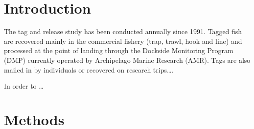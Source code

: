 \documentclass[12pt]{article}\usepackage[]{graphicx}\usepackage[]{color}
\begin{document}

\frontmatter


\renewcommand{\headrulewidth}{0.5pt}  %
\renewcommand{\footrulewidth}{0.5pt}  %

\hypertarget{introduction}{%
\section{Introduction}\label{introduction}}

The tag and release study has been conducted annually since 1991. Tagged fish are recovered mainly in the commercial fishery (trap, trawl, hook and line) and processed at the point of landing through the Dockside Monitoring Program (DMP) currently operated by Archipelago Marine Research (AMR). Tags are also mailed in by individuals or recovered on research trips\ldots.

In order to \ldots{}

\hypertarget{methods}{%
\section{Methods}\label{methods}}
\end{document}

